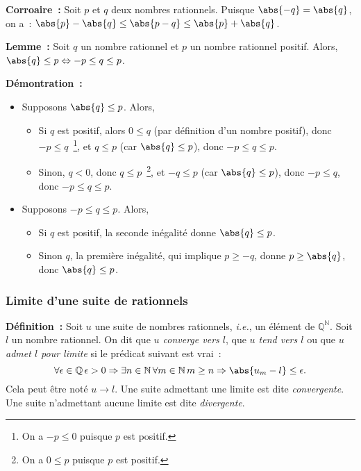     \done

\medskip

\noindent\textbf{Corroaire :} Soit $p$ et $q$ deux nombres rationnels. 
    Puisque $\abs{-q} = \abs{q}$, on a : $\abs{p} - \abs{q} \leq \abs{p - q} \leq \abs{p} + \abs{q}$.

\medskip

\noindent\textbf{Lemme :} Soit $q$ un nombre rationnel et $p$ un nombre rationnel positif. 
    Alors, $\abs{q} \leq p \Leftrightarrow -p \leq q \leq p$.

\medskip

\noindent\textbf{Démontration :} 
\begin{itemize}[nosep]
    \item Supposons $\abs{q} \leq p$. 
        Alors, 
        \begin{itemize}[nosep]
            \item Si $q$ est positif, alors $0 \leq q$ (par définition d'un nombre positif), donc $-p \leq q$~\footnote{On a $-p \leq 0$ puisque $p$ est positif.}, et $q \leq p$ (car $\abs{q} \leq p$), donc $-p \leq q \leq p$.
            \item Sinon, $q < 0$, donc $q \leq p$~\footnote{On a $0 \leq p$ puisque $p$ est positif.}, et $-q \leq p$ (car $\abs{q} \leq p$), donc $-p \leq q$, donc $-p \leq q \leq p$.
        \end{itemize}
    \item Supposons $-p \leq q \leq p$.
        Alors, 
        \begin{itemize}[nosep]
            \item Si $q$ est positif, la seconde inégalité donne $\abs{q} \leq p$.
            \item Sinon $q$, la première inégalité, qui implique $p \geq -q$, donne $p \geq \abs{q}$, donc $\abs{q} \leq p$.
        \end{itemize}
\end{itemize}

\done

\subsubsection{Limite d'une suite de rationnels}

\noindent\textbf{Définition :} Soit $u$ une suite de nombres rationnels, \emph{i.e.}, un élément de $\mathbb{Q}^{\mathbb{N}}$.
    Soit $l$ un nombre rationnel.
    On dit que \emph{$u$ converge vers $l$}, que \emph{$u$ tend vers $l$} ou que \emph{$u$ admet $l$ pour limite} si le prédicat suivant est vrai : 
    \begin{equation*}
        \forall \epsilon \in \mathbb{Q} \, 
        \epsilon > 0 \Rightarrow
            \exists n \in \mathbb{N} \, 
            \forall m \in \mathbb{N} \, 
            m \geq n \Rightarrow
                \abs{u_m - l} \leq \epsilon .
    \end{equation*}
    Cela peut être noté $u \rightarrow l$\sindex[isy]{$\rightarrow$}.
    Une suite admettant une limite est dite \emph{convergente}. 
    Une suite n'admettant aucune limite est dite \emph{divergente}. 

